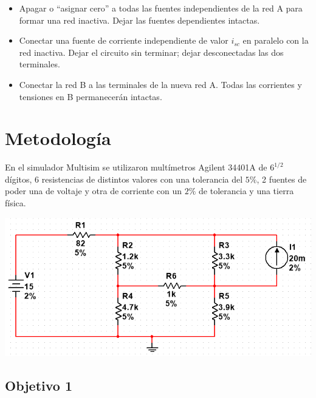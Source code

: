 \documentclass[DIV=calc, paper=a4, fontsize=11pt]{scrartcl}
\newenvironment{Figura}
  {\par\medskip\noindent\minipage{\linewidth}}
  {\endminipage\par\medskip}
\begin{document}
\begin{multicols}{2}
\begin{itemize}
\item Apagar o “asignar cero” a todas las fuentes independientes de la red
A para formar una red inactiva. Dejar las fuentes dependientes intactas.

\item Conectar una fuente de corriente independiente de valor $i_{sc}$ en paralelo
con la red inactiva. Dejar el circuito sin terminar; dejar desconectadas las
dos terminales.

\item Conectar la red B a las terminales de la nueva red A. Todas las corrientes y tensiones en B permanecerán intactas.


\end{itemize}



\section*{Metodología}

En el simulador Multisim se utilizaron multímetros Agilent 34401A de $6^{1/2}$ dígitos, 6 resistencias de distintos valores con una tolerancia del $5\%$, 2 fuentes de poder una de voltaje y otra de corriente con un $2\%$ de tolerancia y una tierra física.

\begin{Figura}
    \centering
    \includegraphics[width=1\textwidth]{circuito.PNG}
    \label{fig}
\end{Figura}

\subsection*{Objetivo 1}


\end{multicols}
\end{document}
